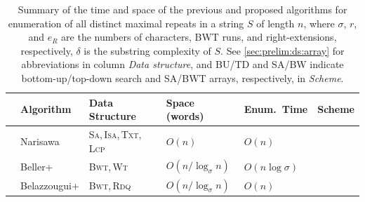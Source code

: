 \begin{table}[t]
  \caption{%
    Summary of the time and space of the previous and proposed algorithms for enumeration of all distinct maximal repeats in a string $S$ of length $n$,
    where
    $\sigma$, $r$, and $e_R$ are the numbers of 
    characters, BWT runs, and right-extensions, respectively, 
    $\delta$ is the substring complexity of $S$.
    See \cref{sec:prelim:ds:array} for abbreviations in column \textit{Data structure}, and BU/TD and SA/BW indicate bottom-up/top-down search and SA/BWT arrays, respectively, in \textit{Scheme}.
}\label{table:summary:new}
\medskip
\begin{minipage}{\textwidth}
\begin{tabular}{%
p{.0em}%
p{7.6em}%
p{10.0em}%
>{\centering}p{7em}%
>{\centering}p{8.5em}%
p{3.0em}%
}\toprule
  & Algorithm
  & Data Structure	
& Space (words)
& Enum.~Time 
& Scheme \\
\midrule 
& Narisawa~\cite{narisawa2007efficient}	&
\textsc{Sa,\,Isa,\,Txt,\,Lcp}\cite{manber:myers1993suffixarrays} & $O(n)$	& $O(n)$ & \BUSA{} 	 \\
& Beller+~\cite{beller:berger2012space:efficient:bbo} 	&
\textsc{Bwt,\,Wt}~\cite{Ferragina05:FM}
& $O(n/\log_\sigma n)$ & $O(n\log\sigma)$	& \TDBW{} \\
& Belazzougui+\cite{belazzougui2015space:unusual} 	&
\textsc{Bwt,\,Rdq}~\cite{belazzougui2020linear}
& $O(n/\log_\sigma n)$ & $O(n)$	& \TDBW{} 	 \\

\end{tabular}
\end{minipage}
\end{table}
